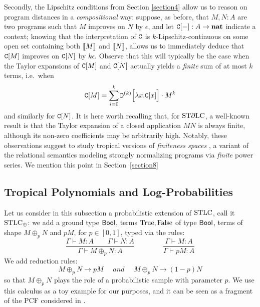 Secondly, the Lipschitz conditions from Section \ref{section4} allow us to reason on program distances in a \emph{compositional} way: suppose, as before, that $M,N:A$ are two programs such that $M$ improves on $N$ by $\epsilon$, and let $\mathtt{C}[-]:A \to \mathbf{nat}$ indicate a context; knowing that the interpretation of $\mathtt{C}$ is $k$-Lipschitz-continuous on some open set containing both $\llbracket M\rrbracket$ and $\llbracket N\rrbracket$, allows us to immediately deduce that $\mathtt{C}[M]$ improves on $\mathtt{C}[N]$ by $k \epsilon$. 
Observe that this will typically be the case when the Taylor expansions of $\mathtt{C}[M]$ and $\mathtt{C}[N]$ actually yields a \emph{finite} sum of at most $k$ terms, i.e.~when 
\begin{align}
\mathtt{C}[M] = \sum_{i=0}^{k} \mathtt{D}^{(k)}\Big[\lambda x.\mathtt{C}[x]\Big]\cdot M^{k}
\end{align}
and similarly for $\mathtt{C}[N]$. It is here worth recalling that, for $\mathrm{ST}\partial\mathrm{LC}$, a well-known result \cite{difflambda} is that the Taylor expansion of a closed application $MN$ is always finite, although its non-zero coefficients may be arbitrarily high. 
Notably, these observations suggest to study tropical versions of \emph{finiteness spaces} \cite{Ehrhard2005}, 
a variant of the relational semantics modeling strongly normalizing programs via \emph{finite} power series.
We mention this point in Section~\ref{section8}


\subsection{Tropical Polynomials and Log-Probabilities}


Let us consider in this subsection a probabilistic extension of $\mathrm{STLC}$, call it $\mathrm{STLC}_\oplus$:
we add a ground type $\mathsf{Bool}$, terms $\mathrm{True},\mathrm{False}$ of type $\mathsf{Bool}$, terms of shape $M\oplus_p N$ and $pM$, for $p\in[0,1]$, typed via the rules:
\[
 \dfrac{\Gamma\vdash M:A \qquad \Gamma\vdash N:A}{\Gamma\vdash M\oplus_p N:A} 
 \qquad\qquad
 \dfrac{\Gamma\vdash M:A}{\Gamma\vdash pM:A}
\]
We add reduction rules:
\[
 M\oplus_p N \to pM \quad \textit{ and } \quad M\oplus_p N \to (1-p)N
\]
so that $M\oplus_p N$ plays the role of a probabilistic sample with parameter $p$.
We use this calculus as a toy example for our purposes, and it can be seen as a fragment of the PCF considered in \cite{Manzo2013}.

